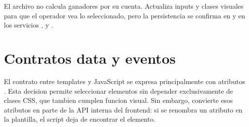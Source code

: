El archivo no calcula ganadores por su cuenta. Actualiza inputs y clases visuales para que el operador vea lo seleccionado, pero la persistencia se confirma en  y en los servicios ,  y .

\section{Contratos data y eventos}
\label{sec:javascript-data-eventos}

El contrato entre templates y JavaScript se expresa principalmente con atributos . Esta decision permite seleccionar elementos sin depender exclusivamente de clases CSS, que tambien cumplen funcion visual. Sin embargo, convierte esos atributos en parte de la API interna del frontend: si se renombra un atributo en la plantilla, el script deja de encontrar el elemento.

